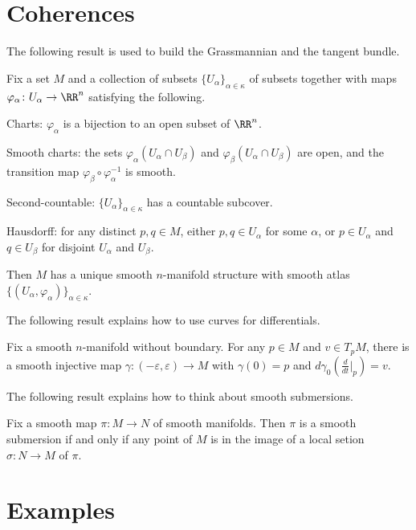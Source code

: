 \documentclass{article}
\begin{document}
\section{Coherences}
The following result is used to build the Grassmannian and the tangent bundle.
\begin{proposition}
	Fix a set $M$ and a collection of subsets $\{U_\alpha\}_{\alpha\in\kappa}$ of subsets together with maps $\varphi_\alpha\colon U_\alpha\to\RR^n$ satisfying the following.
	\begin{listroman}
		\item Charts: $\varphi_\alpha$ is a bijection to an open subset of $\RR^n$.
		\item Smooth charts: the sets $\varphi_\alpha(U_\alpha\cap U_\beta)$ and $\varphi_\beta(U_\alpha\cap U_\beta)$ are open, and the transition map $\varphi_\beta\circ\varphi_\alpha^{-1}$ is smooth.
		\item Second-countable: $\{U_\alpha\}_{\alpha\in\kappa}$ has a countable subcover.
		\item Hausdorff: for any distinct $p,q\in M$, either $p,q\in U_\alpha$ for some $\alpha$, or $p\in U_\alpha$ and $q\in U_\beta$ for disjoint $U_\alpha$ and $U_\beta$.
	\end{listroman}
	Then $M$ has a unique smooth $n$-manifold structure with smooth atlas $\{(U_\alpha,\varphi_\alpha)\}_{\alpha\in\kappa}$.
\end{proposition}
The following result explains how to use curves for differentials.
\begin{proposition}
	Fix a smooth $n$-manifold without boundary. For any $p\in M$ and $v\in T_pM$, there is a smooth injective map $\gamma\colon(-\varepsilon,\varepsilon)\to M$ with $\gamma(0)=p$ and $d\gamma_0\left(\frac d{dt}\big|_p\right)=v$.
\end{proposition}
The following result explains how to think about smooth submersions.
\begin{proposition}
	Fix a smooth map $\pi\colon M\to N$ of smooth manifolds. Then $\pi$ is a smooth submersion if and only if any point of $M$ is in the image of a local setion $\sigma\colon N\to M$ of $\pi$.
\end{proposition}

\section{Examples}
\end{document}
